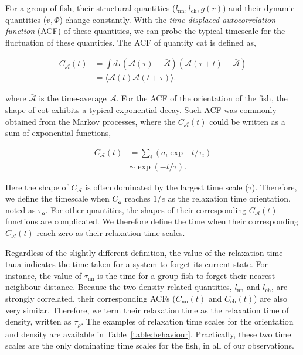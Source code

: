 \documentclass[11pt,twoside]{report}
\begin{document}
For a group of fish, their structural quantities ($l_\mathrm{nn}, l_\mathrm{ch}, g(r)$) and their dynamic quantities ($v, \Phi$) change constantly. With the \emph{time-displaced autocorrelation function} (ACF) of these quantities, we can probe the typical timescale for the fluctuation of these quantities. The ACF of quantity \gls{cat} is defined as, \cite{newman1999}

\begin{equation}
\begin{split}
	C_\mathcal{A}(t)
	&= \int d\tau
	\left(
		\mathcal{A}(\tau) - \bar{\mathcal{A}}
	\right)
	\left(
		\mathcal{A}(\tau + t) - \bar{\mathcal{A}}
	\right) \\
	&= \langle \mathcal{A}(t) \mathcal{A}(t + \tau) \rangle.
\label{eq:acf}
\end{split}
\end{equation}

\noindent where $\bar{\mathcal{A}}$ is the time-average $\mathcal{A}$. For the ACF of the orientation of the fish, the shape of \gls{cot} exhibits a typical exponential decay. Such ACF was commonly obtained from the Markov processes, where the $C_\mathcal{A}(t)$ could be written as a sum of exponential functions,

\begin{equation}
\begin{split}
	C_\mathcal{A}(t) &= \sum_i \left( a_i \exp{-t / \tau_i} \right)\\
	&\sim \exp\left(-t / \tau\right).
\end{split}
\label{eq:tau}
\end{equation}

\noindent Here the shape of $C_\mathcal{A}$ is often dominated by the largest time scale ($\tau$).
Therefore, we define the timescale when $C_\mathbf{o}$ reaches $1/e$ as the relaxation time orientation, noted as $\tau_\mathbf{o}$. For other quantities, the shapes of their corresponding $C_\mathcal{A}(t)$ functions are complicated. We therefore define the time when their corresponding $C_\mathcal{A}(t)$ reach zero as their relaxation time scales.

Regardless of the slightly different definition, the value of the relaxation time \gls{taua} indicates the time taken for a system to forget its current state.
For instance, the value of $\tau_\mathrm{nn}$ is the time for a group fish to forget their nearest neighbour distance. Because the two density-related quantities, $l_\mathrm{nn}$ and $l_\mathrm{ch}$, are strongly correlated, their corresponding ACFs ($C_\mathrm{nn}(t)$ and $C_\mathrm{ch}(t)$) are also very similar. Therefore, we term their relaxation time as the relaxation time of density, written as $\tau_\rho$. The examples of relaxation time scales for the orientation and density are available in Table~\ref{table:behaviour}. Practically, these two time scales are the only dominating time scales for the fish, in all of our observations.
\end{document}
